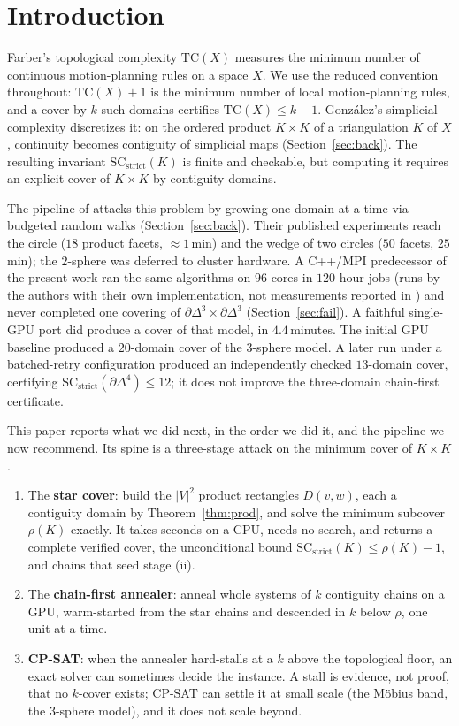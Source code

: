 \documentclass[12pt]{article}
\newcommand{\TC}{\mathrm{TC}}
\newcommand{\SC}{\mathrm{SC}}
\newcommand{\SCst}{\SC_{\mathrm{strict}}}
\begin{document}
\section{Introduction}\label{sec:intro}

Farber's topological complexity $\TC(X)$ \cite{F03} measures the minimum
number of continuous motion-planning rules on a space $X$.
We use the reduced convention throughout: $\TC(X)+1$ is the minimum
number of local motion-planning rules, and a cover by $k$ such
domains certifies $\TC(X)\le k-1$.
Gonz\'alez's simplicial complexity \cite{G18} discretizes it: on the
ordered product $K\times K$ of a triangulation $K$ of $X$, continuity
becomes contiguity of simplicial maps (Section~\ref{sec:back}).  The
resulting invariant $\SCst(K)$ is finite and checkable, but computing
it requires an explicit cover of $K\times K$ by contiguity domains.

The pipeline of \cite{OLGB21} attacks this problem by growing one
domain at a time via budgeted random walks
(Section~\ref{sec:back}).  Their published experiments reach the circle
($18$ product facets, ${\approx}1$\,min) and the wedge of two circles
($50$ facets, $25$\,min); the $2$-sphere was deferred to cluster
hardware.  A C++/MPI predecessor of the present work ran the same
algorithms on $96$ cores in $120$-hour jobs (runs by the authors with
their own implementation, not measurements reported in
\cite{OLGB21}) and never completed one
covering of $\partial\Delta^3\times\partial\Delta^3$
(Section~\ref{sec:fail}).  A faithful single-GPU port did produce a
cover of that model, in $4.4$\,minutes.
The initial GPU baseline produced a $20$-domain cover of the $3$-sphere
model.  A later run under a batched-retry configuration produced an
independently checked $13$-domain cover, certifying
$\SCst(\partial\Delta^4)\leq12$; it does not improve the three-domain
chain-first certificate.

This paper reports what we did next, in the order we did it, and the
pipeline we now recommend.  Its spine is a three-stage attack on the
minimum cover of $K\times K$.

\begin{enumerate}
\item[(i)] The \textbf{star cover}: build the $|V|^2$ product rectangles
$D(v,w)$, each a contiguity domain by Theorem~\ref{thm:prod}, and solve
the minimum subcover $\rho(K)$ exactly.  It takes seconds on a CPU, needs
no search, and returns a complete verified cover, the unconditional bound
$\SCst(K)\le\rho(K)-1$, and chains that seed stage (ii).
\item[(ii)] The \textbf{chain-first annealer}: anneal whole systems of
$k$ contiguity chains on a GPU, warm-started from the star chains and
descended in $k$ below $\rho$, one unit at a time.
\item[(iii)] \textbf{CP-SAT}: when the annealer hard-stalls at a $k$
above the topological floor, an exact solver can sometimes decide the
instance.  A stall is evidence, not proof, that no $k$-cover exists;
CP-SAT can settle it at small scale (the M\"obius band, the $3$-sphere
model), and it does not scale beyond.
\end{enumerate}
\end{document}
